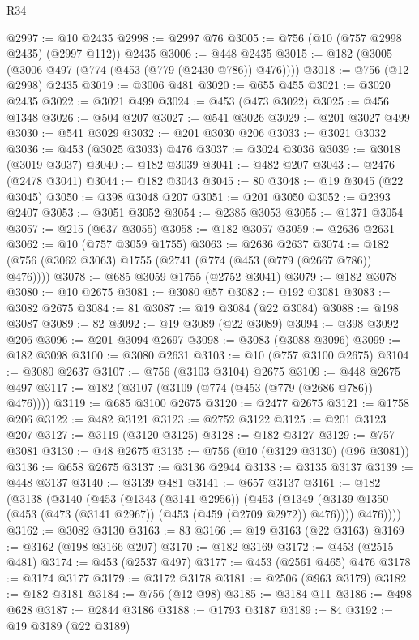 \begin{lexlean}{R34}
\begin{coremodule}
@2997 := @10 @2435
@2998 := @2997 @76
@3005 := @756 (@10 (@757 @2998 @2435) (@2997 @112)) @2435
@3006 := @448 @2435
@3015 := @182 (@3005 (@3006 @497 (@774 (@453 (@779 (@2430 @786)) @476))))
@3018 := @756 (@12 @2998) @2435
@3019 := @3006 @481
@3020 := @655 @455
@3021 := @3020 @2435
@3022 := @3021 @499
@3024 := @453 (@473 @3022)
@3025 := @456 @1348
@3026 := @504 @207
@3027 := @541 @3026
@3029 := @201 @3027 @499
@3030 := @541 @3029
@3032 := @201 @3030 @206
@3033 := @3021 @3032
@3036 := @453 (@3025 @3033) @476
@3037 := @3024 @3036
@3039 := @3018 (@3019 @3037)
@3040 := @182 @3039
@3041 := @482 @207
@3043 := @2476 (@2478 @3041)
@3044 := @182 @3043
@3045 := 80
@3048 := @19 @3045 (@22 @3045)
@3050 := @398 @3048 @207
@3051 := @201 @3050
@3052 := @2393 @2407
@3053 := @3051 @3052
@3054 := @2385 @3053
@3055 := @1371 @3054
@3057 := @215 (@637 @3055)
@3058 := @182 @3057
@3059 := @2636 @2631
@3062 := @10 (@757 @3059 @1755)
@3063 := @2636 @2637
@3074 := @182 (@756 (@3062 @3063) @1755 (@2741 (@774 (@453 (@779 (@2667 @786)) @476))))
@3078 := @685 @3059 @1755 (@2752 @3041)
@3079 := @182 @3078
@3080 := @10 @2675
@3081 := @3080 @57
@3082 := @192 @3081
@3083 := @3082 @2675
@3084 := 81
@3087 := @19 @3084 (@22 @3084)
@3088 := @198 @3087
@3089 := 82
@3092 := @19 @3089 (@22 @3089)
@3094 := @398 @3092 @206
@3096 := @201 @3094 @2697
@3098 := @3083 (@3088 @3096)
@3099 := @182 @3098
@3100 := @3080 @2631
@3103 := @10 (@757 @3100 @2675)
@3104 := @3080 @2637
@3107 := @756 (@3103 @3104) @2675
@3109 := @448 @2675 @497
@3117 := @182 (@3107 (@3109 (@774 (@453 (@779 (@2686 @786)) @476))))
@3119 := @685 @3100 @2675
@3120 := @2477 @2675
@3121 := @1758 @206
@3122 := @482 @3121
@3123 := @2752 @3122
@3125 := @201 @3123 @207
@3127 := @3119 (@3120 @3125)
@3128 := @182 @3127
@3129 := @757 @3081
@3130 := @48 @2675
@3135 := @756 (@10 (@3129 @3130) (@96 @3081))
@3136 := @658 @2675
@3137 := @3136 @2944
@3138 := @3135 @3137
@3139 := @448 @3137
@3140 := @3139 @481
@3141 := @657 @3137
@3161 := @182
    (@3138
      (@3140
        (@453
          (@1343 (@3141 @2956))
          (@453
            (@1349 (@3139 @1350 (@453 (@473 (@3141 @2967)) (@453 (@459 (@2709 @2972)) @476))))
            @476))))
@3162 := @3082 @3130
@3163 := 83
@3166 := @19 @3163 (@22 @3163)
@3169 := @3162 (@198 @3166 @207)
@3170 := @182 @3169
@3172 := @453 (@2515 @481)
@3174 := @453 (@2537 @497)
@3177 := @453 (@2561 @465) @476
@3178 := @3174 @3177
@3179 := @3172 @3178
@3181 := @2506 (@963 @3179)
@3182 := @182 @3181
@3184 := @756 (@12 @98)
@3185 := @3184 @11
@3186 := @498 @628
@3187 := @2844 @3186
@3188 := @1793 @3187
@3189 := 84
@3192 := @19 @3189 (@22 @3189)

\end{coremodule}
\end{lexlean}
